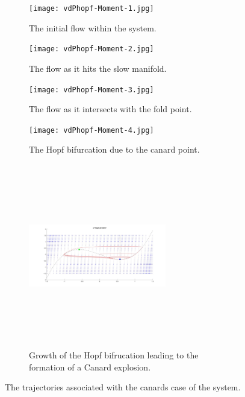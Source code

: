 \begin{figure}[h!]
	\centering
	\begin{subfigure}[t]{0.45\textwidth}
		\centering
		\texttt{[image: vdPhopf-Moment-1.jpg]}
		\caption{The initial flow within the system.} \label{fig:timing1}
	\end{subfigure}
	\hfill
	\begin{subfigure}[t]{0.45\textwidth}
		\centering
		\texttt{[image: vdPhopf-Moment-2.jpg]}
		\caption{The flow as it hits the slow manifold.} \label{fig:timing2}
	\end{subfigure}
	
	\vspace{1cm}
	\begin{subfigure}[t]{0.45\textwidth}
		\centering
		\texttt{[image: vdPhopf-Moment-3.jpg]}
		\caption{The flow as it intersects with the fold point.} \label{fig:timing3}
	\end{subfigure}
	\hfill
	\begin{subfigure}[t]{0.45\textwidth}\centering
		\texttt{[image: vdPhopf-Moment-4.jpg]}
		\caption{The Hopf bifurcation due to the canard point.}\label{fig:timing4}
	\end{subfigure}\vspace{1cm}
	\begin{subfigure}[t]{0.45\textwidth}\centering
		\includegraphics[height=8cm,width=6cm]{Code/behaviourswitch}
		\caption{Growth of the Hopf bifrucation leading to the formation of a Canard explosion.}
		\label{fig: hopf growth}
	\end{subfigure}
	\caption{The trajectories associated with the canards case of the \vdp system.}
	\label{fig: 4 canard }
\end{figure}
